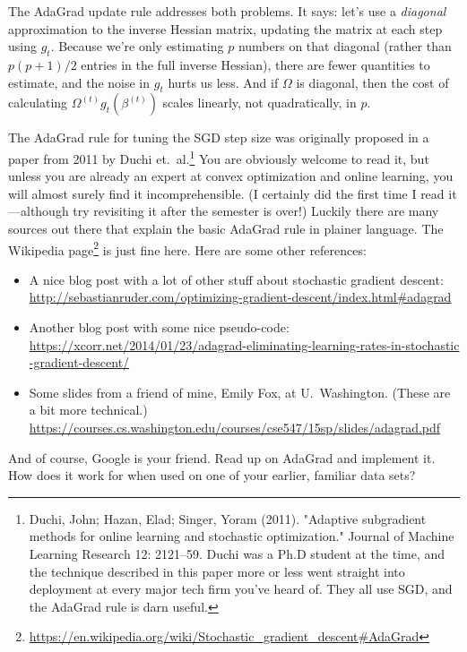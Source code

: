 \documentclass[11 pt]{article}
\begin{document}
The AdaGrad update rule addresses both problems.  It says: let's use a \textit{diagonal} approximation to the inverse Hessian matrix, updating the matrix at each step using $g_t$.  Because we're only estimating $p$ numbers on that diagonal (rather than $p(p+1)/2$ entries in the full inverse Hessian), there are fewer quantities to estimate, and the noise in $g_t$ hurts us less.  And if $\Omega$ is diagonal, then the cost of calculating $\Omega^{(t)} g_t(\beta^{(t)})$ scales linearly, not quadratically, in $p$.

The AdaGrad rule for tuning the SGD step size was originally proposed in a paper from 2011 by Duchi et.~al.\footnote{Duchi, John; Hazan, Elad; Singer, Yoram (2011). "Adaptive subgradient methods for online learning and stochastic optimization."  Journal of Machine Learning Research 12: 2121--59.  Duchi was a Ph.D student at the time, and the technique described in this paper more or less went straight into deployment at every major tech firm you've heard of.  They all use SGD, and the AdaGrad rule is darn useful.}  You are obviously welcome to read it, but unless you are already an expert at convex optimization and online learning, you will almost surely find it incomprehensible.  (I certainly did the first time I read it---although try revisiting it after the semester is over!)  Luckily there are many sources out there that explain the basic AdaGrad rule in plainer language.  The Wikipedia page\footnote{\url{https://en.wikipedia.org/wiki/Stochastic_gradient_descent#AdaGrad}} is just fine here.  Here are some other references:

\begin{itemize}
	
\item A nice blog post with a lot of other stuff about stochastic gradient descent: \\ \url{http://sebastianruder.com/optimizing-gradient-descent/index.html#adagrad} 
\item Another blog post with some nice pseudo-code: \\ \url{https://xcorr.net/2014/01/23/adagrad-eliminating-learning-rates-in-stochastic}  \\ \url{-gradient-descent/}
\item Some slides from a friend of mine, Emily Fox, at U.~Washington.  (These are a bit more technical.)
\url{https://courses.cs.washington.edu/courses/cse547/15sp/slides/adagrad.pdf}
\end{itemize}
And of course, Google is your friend.  Read up on AdaGrad and implement it.  How does it work for when used on one of your earlier, familiar data sets?
\end{document}
